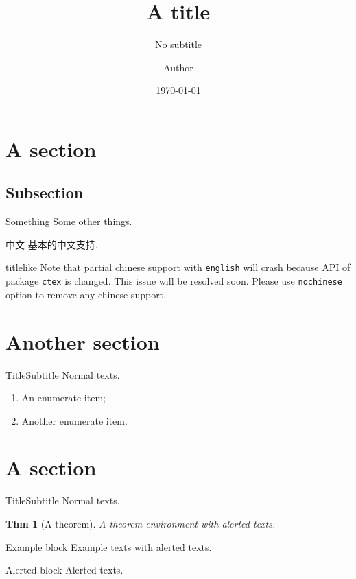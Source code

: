 \documentclass[english, nochinese]{pkuslide}
\title{A title}
\subtitle{No subtitle}
\institute{Peking University}
\author{Author}
\date{\today}
\newtheorem{Thm}{Thm}
\begin{document}
\begin{frame}
\titlepage
\end{frame}

\begin{frame}
\tableofcontents[subsectionstyle=show]
\end{frame}

\section{A section}

\subsection{Subsection}

\begin{frame}{Something}
\centering
Some other things.
\end{frame}

\begin{frame}{中文}
基本的中文支持.

\begin{beamercolorbox}{titlelike}
Note that partial chinese support with \texttt{english} will crash because API of package \texttt{ctex} is changed. This issue will be resolved soon. Please use \texttt{nochinese} option to remove any chinese support.
\end{beamercolorbox}
\end{frame}

\section{Another section}

\frame{\sectionpage}

\begin{frame}{Title}{Subtitle}
Normal texts.
\begin{enumerate}
\item An enumerate item;
\item Another enumerate item.
\end{enumerate}
\end{frame}

\section{A section}

\frame{\sectionpage}

\begin{frame}{Title}{Subtitle}
Normal texts.
\begin{Thm}[A theorem]
A theorem environment with \alert{alerted} texts.
\end{Thm}
\begin{exampleblock}{Example block}
Example texts with \alert{alerted} texts.
\end{exampleblock}
\begin{alertblock}{Alerted block}
Alerted texts.
\end{alertblock}
\end{frame}
\end{document}
